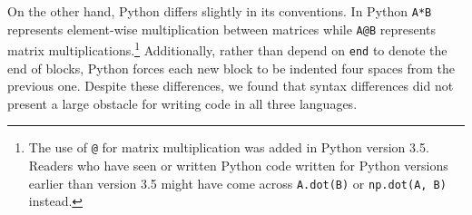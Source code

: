 On the other hand, Python differs slightly in its conventions. In Python
\texttt{A*B} represents element-wise multiplication between matrices while
\texttt{A@B} represents matrix multiplications.\footnote{ The use of \texttt{@}
for matrix multiplication was added in Python version 3.5. Readers who have
seen or written Python code written for Python versions earlier than version
3.5 might have come across \texttt{A.dot(B)} or \texttt{np.dot(A, B)} instead.}
Additionally, rather than depend on \texttt{end} to denote the end of blocks,
Python forces each new block to be indented four spaces from the previous one.
Despite these differences, we found that syntax differences did not present a
large obstacle for writing code in all three languages.

